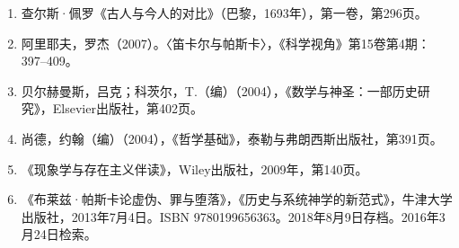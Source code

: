 \begin{enumerate}
\item 查尔斯·佩罗《古人与今人的对比》（巴黎，1693年），第一卷，第296页。
\item 阿里耶夫，罗杰（2007）。〈笛卡尔与帕斯卡〉，《科学视角》第15卷第4期：397–409。
\item 贝尔赫曼斯，吕克；科茨尔，T.（编）（2004），《数学与神圣：一部历史研究》，Elsevier出版社，第402页。
\item 尚德，约翰（编）（2004），《哲学基础》，泰勒与弗朗西斯出版社，第391页。
\item 《现象学与存在主义伴读》，Wiley出版社，2009年，第140页。
\item 《布莱兹·帕斯卡论虚伪、罪与堕落》，《历史与系统神学的新范式》，牛津大学出版社，2013年7月4日。ISBN 9780199656363。2018年8月9日存档。2016年3月24日检索。

\end{enumerate}